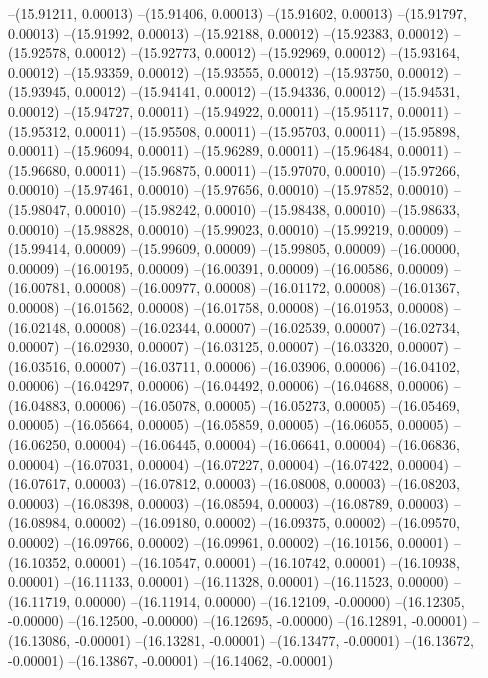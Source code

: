 --(15.91211, 0.00013)
--(15.91406, 0.00013)
--(15.91602, 0.00013)
--(15.91797, 0.00013)
--(15.91992, 0.00013)
--(15.92188, 0.00012)
--(15.92383, 0.00012)
--(15.92578, 0.00012)
--(15.92773, 0.00012)
--(15.92969, 0.00012)
--(15.93164, 0.00012)
--(15.93359, 0.00012)
--(15.93555, 0.00012)
--(15.93750, 0.00012)
--(15.93945, 0.00012)
--(15.94141, 0.00012)
--(15.94336, 0.00012)
--(15.94531, 0.00012)
--(15.94727, 0.00011)
--(15.94922, 0.00011)
--(15.95117, 0.00011)
--(15.95312, 0.00011)
--(15.95508, 0.00011)
--(15.95703, 0.00011)
--(15.95898, 0.00011)
--(15.96094, 0.00011)
--(15.96289, 0.00011)
--(15.96484, 0.00011)
--(15.96680, 0.00011)
--(15.96875, 0.00011)
--(15.97070, 0.00010)
--(15.97266, 0.00010)
--(15.97461, 0.00010)
--(15.97656, 0.00010)
--(15.97852, 0.00010)
--(15.98047, 0.00010)
--(15.98242, 0.00010)
--(15.98438, 0.00010)
--(15.98633, 0.00010)
--(15.98828, 0.00010)
--(15.99023, 0.00010)
--(15.99219, 0.00009)
--(15.99414, 0.00009)
--(15.99609, 0.00009)
--(15.99805, 0.00009)
--(16.00000, 0.00009)
--(16.00195, 0.00009)
--(16.00391, 0.00009)
--(16.00586, 0.00009)
--(16.00781, 0.00008)
--(16.00977, 0.00008)
--(16.01172, 0.00008)
--(16.01367, 0.00008)
--(16.01562, 0.00008)
--(16.01758, 0.00008)
--(16.01953, 0.00008)
--(16.02148, 0.00008)
--(16.02344, 0.00007)
--(16.02539, 0.00007)
--(16.02734, 0.00007)
--(16.02930, 0.00007)
--(16.03125, 0.00007)
--(16.03320, 0.00007)
--(16.03516, 0.00007)
--(16.03711, 0.00006)
--(16.03906, 0.00006)
--(16.04102, 0.00006)
--(16.04297, 0.00006)
--(16.04492, 0.00006)
--(16.04688, 0.00006)
--(16.04883, 0.00006)
--(16.05078, 0.00005)
--(16.05273, 0.00005)
--(16.05469, 0.00005)
--(16.05664, 0.00005)
--(16.05859, 0.00005)
--(16.06055, 0.00005)
--(16.06250, 0.00004)
--(16.06445, 0.00004)
--(16.06641, 0.00004)
--(16.06836, 0.00004)
--(16.07031, 0.00004)
--(16.07227, 0.00004)
--(16.07422, 0.00004)
--(16.07617, 0.00003)
--(16.07812, 0.00003)
--(16.08008, 0.00003)
--(16.08203, 0.00003)
--(16.08398, 0.00003)
--(16.08594, 0.00003)
--(16.08789, 0.00003)
--(16.08984, 0.00002)
--(16.09180, 0.00002)
--(16.09375, 0.00002)
--(16.09570, 0.00002)
--(16.09766, 0.00002)
--(16.09961, 0.00002)
--(16.10156, 0.00001)
--(16.10352, 0.00001)
--(16.10547, 0.00001)
--(16.10742, 0.00001)
--(16.10938, 0.00001)
--(16.11133, 0.00001)
--(16.11328, 0.00001)
--(16.11523, 0.00000)
--(16.11719, 0.00000)
--(16.11914, 0.00000)
--(16.12109, -0.00000)
--(16.12305, -0.00000)
--(16.12500, -0.00000)
--(16.12695, -0.00000)
--(16.12891, -0.00001)
--(16.13086, -0.00001)
--(16.13281, -0.00001)
--(16.13477, -0.00001)
--(16.13672, -0.00001)
--(16.13867, -0.00001)
--(16.14062, -0.00001)
